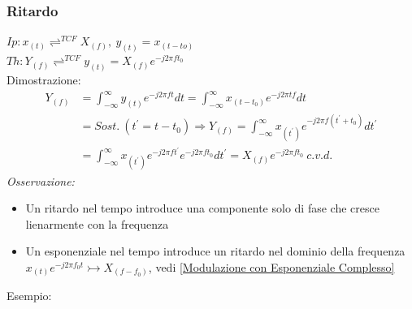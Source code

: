         \subsubsection{Ritardo}\label{Ritardo}
            $Ip: x_{(t)} \rightleftharpoons^{TCF} X_{(f)},\ y_{(t)} = x_{(t-to)}$\\        
            $Th: Y_{(f)} \rightleftharpoons^{TCF} y_{(t)} = X_{(f)}e^{-j2\pi ft_0}$\\ 
            Dimostrazione:
            \begin{align}
                Y_{(f)} & = \int_{-\infty}^{\infty} y_{(t)} e^{-j2\pi ft} dt = \int_{-\infty}^{\infty} x_{(t-t_0)} e^{-j2\pi tf} dt \nonumber \\
                        & =Sost.\ (t^\prime = t-t_0) \Rightarrow  Y_{(f)} = \int_{-\infty}^{\infty} x_{(t^\prime)} e^{-j2\pi f(t^\prime+t_0)} dt^\prime \nonumber \\
                        & =\int_{-\infty}^{\infty} x_{(t^\prime)} e^{-j2\pi ft^\prime}e^{-j2\pi ft_0} dt^\prime= X_{(f)}e^{-j2\pi ft_0}\ c.v.d.  \nonumber
            \end{align}
            {\em Osservazione:}
                \begin{itemize}
                    \item Un ritardo nel tempo introduce una componente solo di fase che cresce lienarmente con la frequenza
                    \item Un esponenziale nel tempo introduce un ritardo nel dominio della frequenza $x_{(t)}e^{-j2\pi f_0t} \rightarrowtail X_{(f-f_0)}$, vedi \ref{Modulazione con Esponenziale Complesso}
                \end{itemize}
            Esempio:\\
